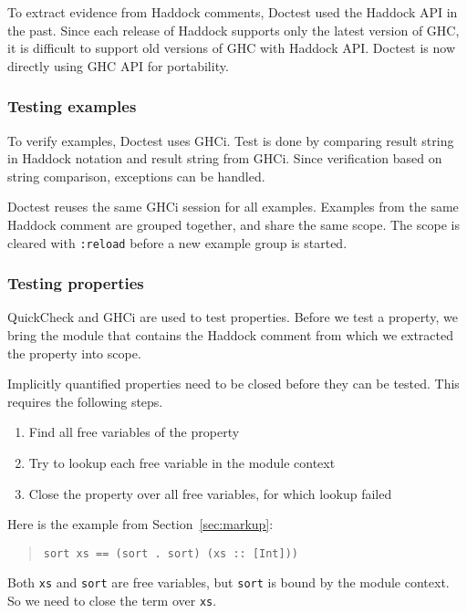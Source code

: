 \documentclass[preprint]{sigplanconf}
\begin{document}
To extract evidence from Haddock comments,
Doctest used the Haddock API in the past.
Since each release of Haddock supports only the latest version of GHC,
it is difficult to support old versions of GHC with Haddock API.
Doctest is now directly using GHC API for portability.

\subsubsection{Testing examples}

To verify examples, Doctest uses GHCi.
Test is done by comparing result string in Haddock notation and
result string from GHCi.
Since verification based on string comparison, exceptions can be handled.

Doctest reuses the same GHCi session for all examples.
Examples from the same Haddock comment are grouped together,
and share the same scope.
The scope is cleared with \verb|:reload| before a new
example group is started.

\subsubsection{Testing properties}

\noindent QuickCheck and GHCi are used to test properties.  Before we
test a property, we bring the module that contains the Haddock comment
from which we extracted the property into scope.

Implicitly quantified properties need to be closed before they can be
tested.  This requires the following steps.
\begin{enumerate}
    \item
        Find all free variables of the property
    \item
        Try to lookup each free variable in the module context
    \item
        Close the property over all free variables, for which lookup
        failed
\end{enumerate}

\noindent Here is the example from Section~\ref{sec:markup}:

\begin{quote}\small\begin{verbatim}
sort xs == (sort . sort) (xs :: [Int]))
\end{verbatim}\end{quote}

\noindent Both \verb|xs| and \verb|sort| are free variables, but
\verb|sort| is bound by the module context.  So we need to close the
term over \verb|xs|.
\end{document}
